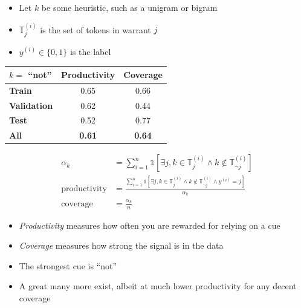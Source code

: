 \documentclass[a0,portrait]{a0poster}
\begin{document}
\begin{multicols}{2}
\begin{minipage}{.5\linewidth}
    \begin{itemize}
        \item Let $k$ be some heuristic, such as a unigram or bigram
        \item $\mathbb{T}_j^{(i)}$ is the set of tokens in warrant $j$
        \item $y^{(i)} \in \{0, 1\}$ is the label
    \end{itemize}
\end{minipage}
\begin{minipage}{.5\linewidth}
    \begin{flushright}
        \begin{center}
        \begin{tabular}{|l|cc|}
        \hline
         $k =$ \textbf{``not''} & \textbf{Productivity} & \textbf{Coverage} \\
        \hline
        \textbf{Train} & 0.65 & 0.66 \\
        \textbf{Validation} & 0.62 & 0.44 \\
        \textbf{Test} & 0.52 & 0.77 \\
        \hline
        \textbf{All} & \textbf{0.61} & \textbf{0.64} \\
        \hline
        \end{tabular}
        \end{center}
    \end{flushright}
\end{minipage}

\vspace{8pt}

\begin{center}
    \begin{align*}
        \alpha_k &= \sum_{i=1}^n \mathbb{1} \left[ \exists j, k \in \mathbb{T}^{(i)}_j \land k \notin \mathbb{T}^{(i)}_{\lnot j} \right] \\
        \text{productivity} &= \frac{\sum_{i=1}^n \mathbb{1} \left[ \exists j, k \in \mathbb{T}^{(i)}_j \land k \notin \mathbb{T}^{(i)}_{\lnot j} \land y^{(i)} = j \right]}{\alpha_k} \\
        \text{coverage} &= \frac{\alpha_k}{n}
    \end{align*}
\end{center}

\vspace{8pt}

\begin{itemize}
    \item \textit{Productivity} measures how often you are rewarded for relying on a cue
    \item \textit{Coverage} measures how strong the signal is in the data
    \item The strongest cue is ``not''
    \item A great many more exist, albeit at much lower productivity for any decent coverage
\end{itemize}


\end{multicols}
\end{document}
